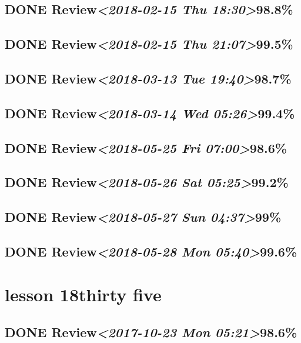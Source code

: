 \documentclass[11pt]{ctexart}
\begin{document}
\subsection{{\bfseries\sffamily DONE} Review\textit{<2018-02-15 Thu 18:30>}98.8\%}
\label{sec:orgd7973d6}
\subsection{{\bfseries\sffamily DONE} Review\textit{<2018-02-15 Thu 21:07>}99.5\%}
\label{sec:org16698d4}
\subsection{{\bfseries\sffamily DONE} Review\textit{<2018-03-13 Tue 19:40>}98.7\%}
\label{sec:org623eb92}
\subsection{{\bfseries\sffamily DONE} Review\textit{<2018-03-14 Wed 05:26>}99.4\%}
\label{sec:org9f915a3}
\subsection{{\bfseries\sffamily DONE} Review\textit{<2018-05-25 Fri 07:00>}98.6\%}
\label{sec:org6e1b4fe}
\subsection{{\bfseries\sffamily DONE} Review\textit{<2018-05-26 Sat 05:25>}99.2\%}
\label{sec:org34f0106}
\subsection{{\bfseries\sffamily DONE} Review\textit{<2018-05-27 Sun 04:37>}99\%}
\label{sec:org36aa3ad}
\subsection{{\bfseries\sffamily DONE} Review\textit{<2018-05-28 Mon 05:40>}99.6\%}
\label{sec:org2b261b7}
\section{lesson 18thirty five}
\label{sec:orgf8e19e5}
\subsection{{\bfseries\sffamily DONE} Review\textit{<2017-10-23 Mon 05:21>}98.6\%}
\label{sec:org052ecfe}
\end{document}
